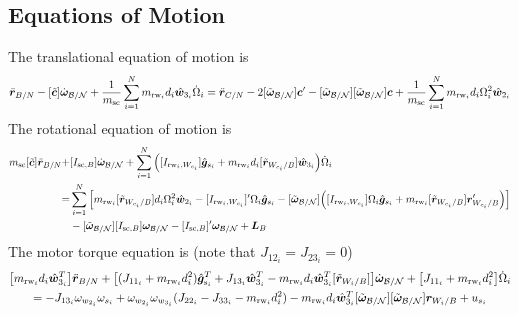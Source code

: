\documentclass[]{BasiliskReportMemo}
\begin{document}
\subsection{Equations of Motion}
The translational equation of motion is
\begin{equation}
	\ddot{\bm r}_{B/N} -[\tilde{\bm{c}}]\dot{\bm\omega}_{\cal B/N} +\frac{1}{m_{\text{sc}}}\sum\limits_{i=1}^{N}m_{\text{rw}_i}d_i\hat{\bm{w}}_{3_i}\dot{\Omega}_i = \ddot{\bm r}_{C/N}   - 2[\tilde{\bm\omega}_{\cal B/N}]\bm{c}'-[\tilde{\bm\omega}_{\cal B/N}][\tilde{\bm\omega}_{\cal B/N}]\bm{c} + \frac{1}{m_{\text{sc}}}\sum\limits_{i=1}^{N}m_{\text{rw}_i}d_i\Omega_i^2\hat{\bm{w}}_{2_i}
	\label{eq:rBddot}
\end{equation}
The rotational equation of motion is
\begin{equation}
	\begin{split}
		m_{\text{sc}}[\tilde{\bm c}]\ddot{\bm r}_{B/N} +& [I_{\text{sc},B}]\dot{\bm\omega}_{\cal B/N} +\sum\limits_{i=1}^{N}\Big([I_{\text{rw}_i,W_{c_i}}]\hat{\bm{g}}_{s_i} + m_{\text{rw}_i}d_i[\tilde{\bm{r}}_{W_{c_i}/B}]\hat{\bm{w}}_{3_i}\Big)\dot{\Omega}_i
		\\=&
		\sum\limits_{i=1}^{N}\Big[ m_{\text{rw}_i}[\tilde{\bm{r}}_{W_{c_i}/B}]d_i \Omega_i^2\hat{\bm{w}}_{2_i}-[I_{\text{rw}_i,W_{c_i}}]'\Omega_i \hat{\bm{g}}_{s_i} -[\tilde{\bm\omega}_{\cal B/N}]\Big([I_{\text{rw}_i,W_{c_i}}]\Omega_i \hat{\bm{g}}_{s_i}+ m_{\text{rw}_i}[\tilde{\bm{r}}_{W_{c_i}/B}]\bm{r}'_{W_{c_i}/B}\Big)\Big]
		\\&  -[\tilde{\bm\omega}_{\cal B/N}][I_{\text{sc},B}]\bm\omega_{\cal B/N}-  [I_{\text{sc},B}]'\bm\omega_{\cal B/N} + \bm{L}_B
	\end{split}
	\label{eq:rotationalEOM}
\end{equation}
The motor torque equation is (note that $J_{12_i} = J_{23_i} = 0$)
\begin{multline}
	\big[m_{\text{rw}_i} d_i \hat{\bm{w}}_{3_i}^T\big]\ddot{\bm{r}}_{B/N} + \big[(J_{11_i} + m_{\text{rw}_i} d_i^2)\hat{\bm g}_{\text{s}_i}^T  + J_{13_i}\hat{\bm w}_{3_i}^T -m_{\text{rw}_i} d_i \hat{\bm{w}}_{3_i}^T [\tilde{\bm r}_{W_i/B}]\big]\dot{\bm\omega}_{\cal B/N} + \big[J_{11_i} + m_{\text{rw}_i} d_i^2\big]\dot{\Omega}_i
	\\=   - J_{13_i} \omega_{w_{2_i}}\omega_{s_i}
	+ \omega_{w_{2_i}} \omega_{w_{3_i}} (J_{22_i} - J_{33_i} - m_{\text{rw}_i} d_i^2
	)
	 -m_{\text{rw}_i} d_i \hat{\bm{w}}_{3_i}^T [\tilde{\bm\omega}_{\cal B/N}] [\tilde{\bm\omega}_{\cal B/N}] \bm r_{W_i/B} + u_{s_i}
	\label{eq:motorTorqueFinal}
\end{multline}
\end{document}
